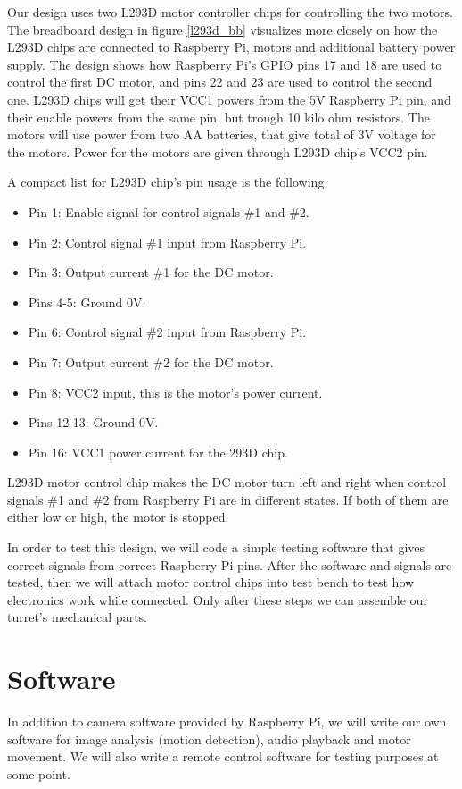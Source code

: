 \documentclass[english,11pt,twoside,a4paper]{article}
\begin{document}
Our design uses two L293D motor controller chips for controlling the two motors. The breadboard design in figure \ref{l293d_bb} visualizes more closely on how the L293D chips are connected to Raspberry Pi, motors and additional battery power supply. The design shows how Raspberry Pi's GPIO pins 17 and 18 are used to control the first DC motor, and pins 22 and 23 are used to control the second one. L293D chips will get their VCC1 powers from the 5V Raspberry Pi pin, and their enable powers from the same pin, but trough 10 kilo ohm resistors. The motors will use power from two AA batteries, that give total of 3V voltage for the motors. Power for the motors are given through L293D chip's VCC2 pin.

A compact list for L293D chip's pin usage is the following:
\begin{itemize}
\item Pin 1: Enable signal for control signals \#1 and \#2.
\item Pin 2: Control signal \#1 input from Raspberry Pi.
\item Pin 3: Output current \#1 for the DC motor.
\item Pins 4-5: Ground 0V.
\item Pin 6: Control signal \#2 input from Raspberry Pi.
\item Pin 7: Output current \#2 for the DC motor.
\item Pin 8: VCC2 input, this is the motor's power current.
\item Pins 12-13: Ground 0V.
\item Pin 16: VCC1 power current for the 293D chip.
\end{itemize}

L293D motor control chip makes the DC motor turn left and right when control signals \#1 and \#2 from Raspberry Pi are in different states. If both of them are either low or high, the motor is stopped.

In order to test this design, we will code a simple testing software that gives correct signals from correct Raspberry Pi pins. After the software and signals are tested, then we will attach motor control chips into test bench to test how electronics work while connected. Only after these steps we can assemble our turret's mechanical parts.

\section{Software}
In addition to camera software provided by Raspberry Pi, we will write our own software for image analysis (motion detection), audio playback and motor movement. We will also write a remote control software for testing purposes at some point.
\end{document}
